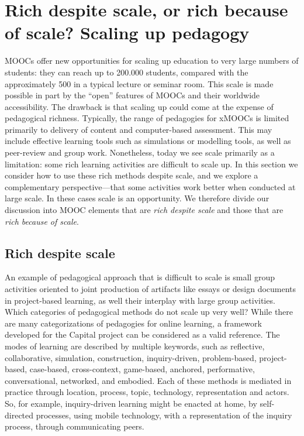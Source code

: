 \section{Rich despite scale, or rich because of scale?  Scaling up pedagogy}


MOOCs offer new opportunities for scaling up education to very large
numbers of students:
they can reach up to 200.000 students, compared with the approximately
500 in a typical lecture or seminar room.
This scale is made possible
in part by the ``open'' features of MOOCs and their worldwide
accessibility.
The drawback is that scaling up could come at the
expense of pedagogical richness. Typically, the range of pedagogies for
xMOOCs is limited primarily to delivery of content and computer-based
assessment. This may include effective learning tools such as
simulations or modelling tools, as well as peer-review and group
work. Nonetheless, today we see scale primarily as a limitation: some
rich learning 
activities are difficult to scale up. In this section we consider
how to use these rich methods despite scale, and we explore a
complementary perspective---that some activities work better when conducted at
large scale. In these cases scale is an opportunity.  We therefore
divide our discussion into MOOC elements that are \emph{rich despite
  scale} and those that are \emph{rich because of scale}.

\subsection{Rich despite scale}

An example of pedagogical approach that is difficult to scale is small
group activities oriented to joint production of artifacts like essays
or design documents in project-based learning, as well their interplay
with large group activities. Which categories of pedagogical methods do
not scale up very well? While there are many categorizations of
pedagogies for online learning, a framework developed for the Capital
project  can be considered as a valid reference. The modes of learning
are described by multiple keywords, such as reflective, collaborative,
simulation, construction, inquiry-driven, problem-based, project-based,
case-based, cross-context, game-based, anchored, performative,
conversational, networked, and embodied. Each of these methods is
mediated in practice through location, process, topic, technology,
representation and actors. So, for example, inquiry-driven learning
might be enacted at home, by self-directed processes, using mobile technology,
with a representation of the
inquiry process, through communicating peers.

